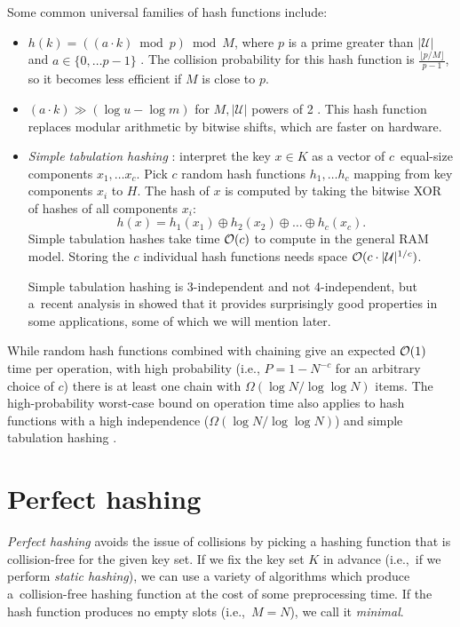 Some common universal families of hash functions include:
\begin{itemize}
\item $h(k)=((a\cdot k)\bmod p)\bmod M$, where $p$ is a prime
	greater than $|\mathcal{U}|$ and $a\in\{0,\ldots p-1\}$
	\cite{univ-classes}. The collision probability for this hash function
	is $\frac{\lfloor p/M\rfloor}{p-1}$, so it becomes less efficient
	if $M$ is close to $p$.
\item $(a\cdot k)\gg(\log u-\log m)$ for $M, |\mathcal{U}|$ powers of 2
	\cite{dietzfelbinger}.
	This hash function replaces modular arithmetic by bitwise shifts,
	which are faster on hardware.
\item \emph{Simple tabulation hashing} \cite{univ-classes}:
	interpret the key $x\in K$ as a vector
	of $c$~equal-size components $x_1,\ldots x_c$. Pick $c$ random hash
	functions $h_1,\ldots h_c$ mapping from key components $x_i$ to $H$.
	The hash of $x$ is computed by taking the bitwise XOR
	of hashes of all components $x_i$:
	$$h(x)=h_1(x_1)\oplus h_2(x_2)\oplus \ldots \oplus h_c(x_c).$$
	Simple tabulation hashes take time $\mathcal{O}(c)$ to compute in the general RAM
	model. Storing the $c$ individual hash functions needs space
	$\mathcal{O}(c\cdot |\mathcal{U}|^{1/c})$.  %

	Simple tabulation hashing is 3-independent and not 4-independent,
	but a~recent analysis in \cite{power-of-simple-tab} showed that
	it provides surprisingly good properties in some applications,
	some of which we will mention later.
\end{itemize}

While random hash functions combined with chaining give an expected $\mathcal{O}(1)$
time per operation, with high probability (i.e.,  $P=1-N^{-c}$ for an arbitrary
choice of $c$) there is at least one chain with $\Omega(\log N/\log\log N)$
items. The high-probability worst-case bound on operation time also applies
to hash functions with a high independence ($\Omega(\log N/\log\log N)$)
\cite{chernoff-hoeffding-bounds} and simple tabulation
hashing \cite{power-of-simple-tab}.

\section{Perfect hashing}
\emph{Perfect hashing} avoids the issue of collisions by picking a hashing
function that is collision-free for the given key set. If we fix the key set
$K$ in advance (i.e.,\ if we perform \emph{static hashing}), we can use
a variety of algorithms which produce a~collision-free hashing function at
the cost of some preprocessing time. If the hash function produces no empty
slots (i.e.,\ $M=N$), we call it \emph{minimal}.

